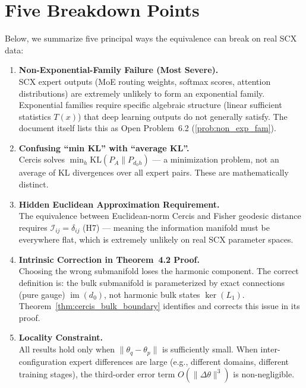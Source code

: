 \documentclass{article}
\newcommand{\KL}{\mathrm{KL}}
\newcommand{\Fisher}{\mathcal{I}}
\newcommand{\Lone}{L_1}
\DeclareMathOperator{\im}{im}
\begin{document}
\section{Five Breakdown Points}

Below, we summarize five principal ways the equivalence can break on real SCX data:

\vspace{0.5em}

\begin{enumerate}[label=\textbf{B\arabic*:}, leftmargin=*, itemsep=0.8em]

    \item \textbf{Non-Exponential-Family Failure (Most Severe).} \\
    SCX expert outputs (MoE routing weights, softmax scores, attention distributions)
    are extremely unlikely to form an exponential family. Exponential families require specific
    algebraic structure (linear sufficient statistics $T(x)$) that deep learning outputs do not
    generally satisfy. The document itself lists this as Open Problem~6.2 (\ref{prob:non_exp_fam}).

    \item \textbf{Confusing ``min KL'' with ``average KL''.} \\
    Cercis solves $\min_h \KL(P_A \| P_{d_0 h})$ — a minimization problem, not an average of
    KL divergences over all expert pairs. These are mathematically distinct.

    \item \textbf{Hidden Euclidean Approximation Requirement.} \\
    The equivalence between Euclidean-norm Cercis and Fisher geodesic distance requires
    $\Fisher_{ij} = \delta_{ij}$ (H7) — meaning the information manifold must be everywhere flat,
    which is extremely unlikely on real SCX parameter spaces.

    \item \textbf{Intrinsic Correction in Theorem~4.2 Proof.} \\
    Choosing the wrong submanifold loses the harmonic component. The correct definition is:
    the bulk submanifold is parameterized by exact connections (pure gauge) $\im(d_0)$,
    not harmonic bulk states $\ker(\Lone)$. Theorem~\ref{thm:cercis_bulk_boundary} identifies
    and corrects this issue in its proof.

    \item \textbf{Locality Constraint.} \\
    All results hold only when $\|\theta_q - \theta_p\|$ is sufficiently small.
    When inter-configuration expert differences are large (e.g., different domains, different
    training stages), the third-order error term $O(\|\Delta\theta\|^3)$ is non-negligible.

\end{enumerate}
\end{document}
